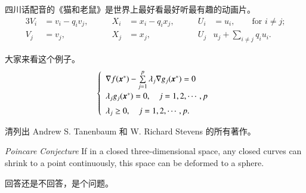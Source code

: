 \begin{corollary}
    \label{thm-corollary-example}
    四川话配音的《猫和老鼠》是世界上最好看最好听最有趣的动画片。
    \begin{alignat}{3}
        V_i & =v_i - q_i v_j, & \qquad X_i & = x_i - q_i x_j, &
        \qquad U_i & = u_i, \qquad \text{for $i\ne j$;} \\
        V_j & = v_j,          & \qquad X_j & = x_j, &
        \qquad U_j & u_j + \sum_{i\ne j} q_i u_i.
    \end{alignat}
\end{corollary}

\begin{example}
    \label{thm-example-example}
    大家来看这个例子。
    \begin{equation}
        \left\{
        \begin{array}{l}
            \nabla f({\mbox{\boldmath $x$}}^*)-
                \sum\limits_{j=1}^p\lambda_j\nabla g_j
                ({\mbox{\boldmath $x$}}^*)=0 \\ [0.3cm]
            \lambda_jg_j({\mbox{\boldmath $x$}}^*)=0,
                \quad j=1,2,\cdots,p \\ [0.2cm]
            \lambda_j\ge 0,\quad j=1,2,\cdots,p.
        \end{array}
        \right.
    \end{equation}
\end{example}

\begin{exercise}
    \label{thm-exercise-example}
    清列出 Andrew S. Tanenbaum 和 W. Richard Stevens 的所有著作。
\end{exercise}

\begin{conjecture}
    \label{thm-conjecture-example}
    \textit{Poincare Conjecture} If in a closed three-dimensional space,
    any closed curves can shrink to a point continuously,
    this space can be deformed to a sphere.
\end{conjecture}

\begin{problem}
    \label{thm-problem-example}
    回答还是不回答，是个问题。
\end{problem}
